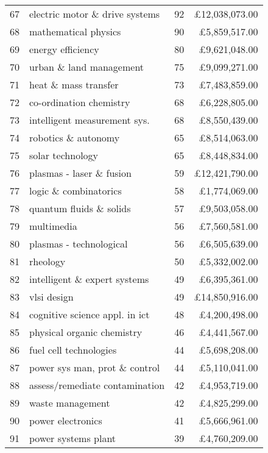 \begin{spacing}{0.9}
\begin{longtable}[c]{r|>{\raggedleft\arraybackslash}m{6.5cm}|>{\raggedleft\arraybackslash}m{1.9cm}|r}
{67} & {electric motor \& drive systems} & {92} & {\pounds12,038,073.00}\\
{68} & {mathematical physics} & {90} & {\pounds5,859,517.00}\\
{69} & {energy efficiency} & {80} & {\pounds9,621,048.00}\\
{70} & {urban \& land management} & {75} & {\pounds9,099,271.00}\\
{71} & {heat \& mass transfer} & {73} & {\pounds7,483,859.00}\\
{72} & {co-ordination chemistry} & {68} & {\pounds6,228,805.00}\\
{73} & {intelligent measurement sys.} & {68} & {\pounds8,550,439.00}\\
{74} & {robotics \& autonomy} & {65} & {\pounds8,514,063.00}\\
{75} & {solar technology} & {65} & {\pounds8,448,834.00}\\
{76} & {plasmas - laser \& fusion} & {59} & {\pounds12,421,790.00}\\
{77} & {logic \& combinatorics} & {58} & {\pounds1,774,069.00}\\
{78} & {quantum fluids \& solids} & {57} & {\pounds9,503,058.00}\\
{79} & {multimedia} & {56} & {\pounds7,560,581.00}\\
{80} & {plasmas - technological} & {56} & {\pounds6,505,639.00}\\
{81} & {rheology} & {50} & {\pounds5,332,002.00}\\
{82} & {intelligent \& expert systems} & {49} & {\pounds6,395,361.00}\\
{83} & {vlsi design} & {49} & {\pounds14,850,916.00}\\
{84} & {cognitive science appl. in ict} & {48} & {\pounds4,200,498.00}\\
{85} & {physical organic chemistry} & {46} & {\pounds4,441,567.00}\\
{86} & {fuel cell technologies} & {44} & {\pounds5,698,208.00}\\
{87} & {power sys man, prot \& control} & {44} & {\pounds5,110,041.00}\\
{88} & {assess/remediate contamination} & {42} & {\pounds4,953,719.00}\\
{89} & {waste management} & {42} & {\pounds4,825,299.00}\\
{90} & {power electronics} & {41} & {\pounds5,666,961.00}\\
{91} & {power systems plant} & {39} & {\pounds4,760,209.00}\\

\end{longtable}
\end{spacing}
